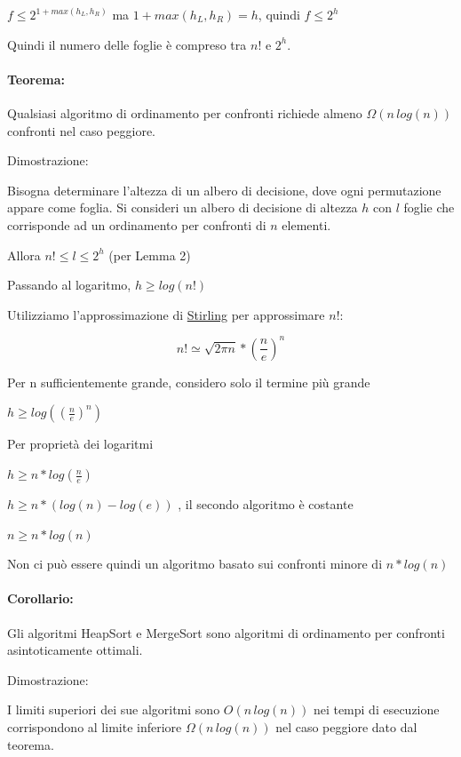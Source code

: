 \documentclass[tikz]{article}
\let\oldparagraph\paragraph
\renewcommand{\paragraph}[1]{\oldparagraph{#1}\mbox{}}
\begin{document}
{$f \leq 2^{1+max(h_L,h_R)}$ ma $1+max(h_L,h_R) = h$, quindi $f \leq 2^h$}

{Quindi il numero delle foglie è compreso tra $n!$ e $2^h$.}

\paragraph{Teorema:}

{Qualsiasi algoritmo di ordinamento per confronti richiede almeno $\Omega(n\,log(n))$ confronti nel caso peggiore.}

{Dimostrazione:}

{Bisogna determinare l'altezza di un albero di decisione, dove ogni permutazione appare come foglia. Si consideri un albero di decisione di altezza $h$ con $l$ foglie che corrisponde ad un ordinamento per confronti di $n$ elementi. }

{Allora $n! \leq l \leq 2^h$ (per Lemma 2)}

{Passando al logaritmo, $h \geq log(n!)$}

{Utilizziamo l'approssimazione di \href{https://www.google.com/url?q=https://it.wikipedia.org/wiki/Approssimazione_di_Stirling\&sa=D\&ust=1523379128517000}{Stirling} per approssimare $n!$:}

\begin{equation}
n! \simeq \sqrt{2\pi n }* {(\frac{n}{e})}^n
\end{equation}

{Per n sufficientemente grande, considero solo il termine più grande}

$h \geq log({(\frac{n}{e})}^n)$

{Per proprietà dei logaritmi}

$h \geq n*log(\frac{n}{e})$

{$h \geq n*(log(n) - log(e))$ , il secondo algoritmo è costante}

$n \geq n * log(n)$

{Non ci può essere quindi un algoritmo basato sui confronti minore di $n * log(n)$}

\paragraph{Corollario:}

{Gli algoritmi HeapSort e MergeSort sono algoritmi di ordinamento per confronti asintoticamente ottimali.}

{Dimostrazione:}

{I limiti superiori dei sue algoritmi sono $O(n\,log(n))$ nei tempi di esecuzione corrispondono al limite inferiore $\Omega(n\,log(n))$ nel caso peggiore dato dal teorema.}
\end{document}
